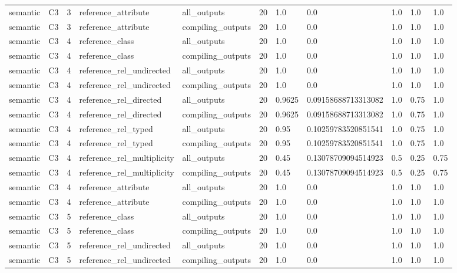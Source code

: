 \begin{tabular}{lllllllllll}
semantic & C3 & 3 & reference\_attribute & all\_outputs & 20 & 1.0 & 0.0 & 1.0 & 1.0 & 1.0 \\
semantic & C3 & 3 & reference\_attribute & compiling\_outputs & 20 & 1.0 & 0.0 & 1.0 & 1.0 & 1.0 \\
semantic & C3 & 4 & reference\_class & all\_outputs & 20 & 1.0 & 0.0 & 1.0 & 1.0 & 1.0 \\
semantic & C3 & 4 & reference\_class & compiling\_outputs & 20 & 1.0 & 0.0 & 1.0 & 1.0 & 1.0 \\
semantic & C3 & 4 & reference\_rel\_undirected & all\_outputs & 20 & 1.0 & 0.0 & 1.0 & 1.0 & 1.0 \\
semantic & C3 & 4 & reference\_rel\_undirected & compiling\_outputs & 20 & 1.0 & 0.0 & 1.0 & 1.0 & 1.0 \\
semantic & C3 & 4 & reference\_rel\_directed & all\_outputs & 20 & 0.9625 & 0.09158688713313082 & 1.0 & 0.75 & 1.0 \\
semantic & C3 & 4 & reference\_rel\_directed & compiling\_outputs & 20 & 0.9625 & 0.09158688713313082 & 1.0 & 0.75 & 1.0 \\
semantic & C3 & 4 & reference\_rel\_typed & all\_outputs & 20 & 0.95 & 0.10259783520851541 & 1.0 & 0.75 & 1.0 \\
semantic & C3 & 4 & reference\_rel\_typed & compiling\_outputs & 20 & 0.95 & 0.10259783520851541 & 1.0 & 0.75 & 1.0 \\
semantic & C3 & 4 & reference\_rel\_multiplicity & all\_outputs & 20 & 0.45 & 0.13078709094514923 & 0.5 & 0.25 & 0.75 \\
semantic & C3 & 4 & reference\_rel\_multiplicity & compiling\_outputs & 20 & 0.45 & 0.13078709094514923 & 0.5 & 0.25 & 0.75 \\
semantic & C3 & 4 & reference\_attribute & all\_outputs & 20 & 1.0 & 0.0 & 1.0 & 1.0 & 1.0 \\
semantic & C3 & 4 & reference\_attribute & compiling\_outputs & 20 & 1.0 & 0.0 & 1.0 & 1.0 & 1.0 \\
semantic & C3 & 5 & reference\_class & all\_outputs & 20 & 1.0 & 0.0 & 1.0 & 1.0 & 1.0 \\
semantic & C3 & 5 & reference\_class & compiling\_outputs & 20 & 1.0 & 0.0 & 1.0 & 1.0 & 1.0 \\
semantic & C3 & 5 & reference\_rel\_undirected & all\_outputs & 20 & 1.0 & 0.0 & 1.0 & 1.0 & 1.0 \\
semantic & C3 & 5 & reference\_rel\_undirected & compiling\_outputs & 20 & 1.0 & 0.0 & 1.0 & 1.0 & 1.0 \\

\end{tabular}
